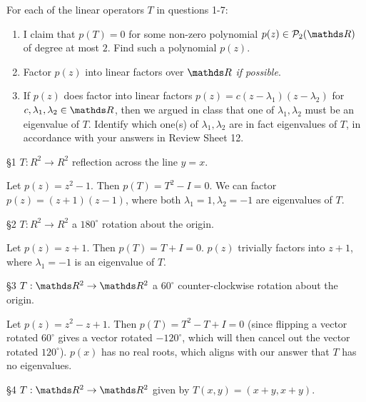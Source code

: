 \documentclass{review-sheet}
\begin{document}
For each of the linear operators $T$ in questions 1-7:
\begin{enumerate}[label=(\alph*)]
  \item I claim that $p(T)=0$ for some non-zero polynomial $p(z)\in \mc{P}_2(\R)$ of degree at most
    $2$. Find such a polynomial $p(z)$.
  \item Factor $p(z)$ into linear factors over $\R$ \textit{if possible}.
  \item If $p(z)$ does factor into linear factors $p(z)=c(z-\lambda_1)(z-\lambda_2)$ for
    $c,\lambda_1,\lambda_2\in \R$, then we argued in class that one of $\lambda_1,\lambda_2$ must be
    an eigenvalue of $T$. Identify which one(s) of $\lambda_1,\lambda_2$ are in fact eigenvalues of
    $T$, in accordance with your answers in Review Sheet 12.
\end{enumerate}
\begin{problem}{\S 1}
  $T:R^2\to R^2$ reflection across the line $y=x$.
\end{problem}
\begin{solution}
  Let $p(z)=z^2-1$. Then $p(T)=T^2-I=0$. We can factor $p(z)=(z+1)(z-1)$, where both
  $\lambda_1=1,\lambda_2=-1$ are eigenvalues of $T$.
\end{solution}

\begin{problem}{\S 2}
  $T:R^2\to R^2$ a $180^{\circ}$ rotation about the origin.
\end{problem}

\begin{solution}
  Let $p(z)=z+1$. Then $p(T)=T+I=0$. $p(z)$ trivially factors into $z+1$, where $\lambda_1=-1$ is
  an eigenvalue of $T$.
\end{solution}

\begin{problem}{\S 3}
  $T:\R^2\to \R^2$ a $60^{\circ}$ counter-clockwise rotation about the origin.
\end{problem}

\begin{solution}
  Let $p(z)=z^2-z+1$. Then $p(T)=T^2-T+I=0$ (since flipping a vector rotated $60^{\circ}$ gives a
  vector rotated $-120^{\circ}$, which will then cancel out the vector rotated $120^{\circ}$).
  $p(x)$ has no real roots, which aligns with our answer that $T$ has no eigenvalues.
\end{solution}

\begin{problem}{\S 4}
  $T:\R^2\to \R^2$ given by $T(x,y)=(x+y,x+y)$.
\end{problem}
\end{document}
